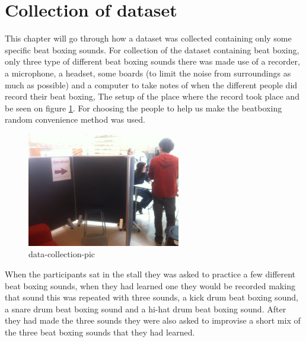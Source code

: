 \section{Collection of dataset}
This chapter will go through how a dataset was collected containing only some specific beat boxing sounds.
For collection of the dataset containing beat boxing, only three type of different beat boxing sounds there was made use of a recorder, a microphone, a headset, some boards (to limit the noise from surroundings as much as possible) and a computer to take notes of when the different people did record their beat boxing, The setup of the place where the record took place and be seen on figure \ref{data-collection-pic}. For choosing the people to help us make the beatboxing random convenience method was used. 
\begin{figure}[h]
	\begin{center}
		\includegraphics[height=5cm]{fig/dataset_collection.JPG}
		\caption{data-collection-pic}
		\label{data-collection-pic}
	\end{center}
\end{figure}
When the participants sat in the stall they was asked to practice a few different beat boxing sounds, when they had learned one they would be recorded making that  sound this was repeated with three sounds, a kick drum beat boxing sound, a snare drum beat boxing sound and a hi-hat drum beat boxing sound. After they had made the three sounds they were also asked to improvise a short mix of the three beat boxing sounds that they had learned.
